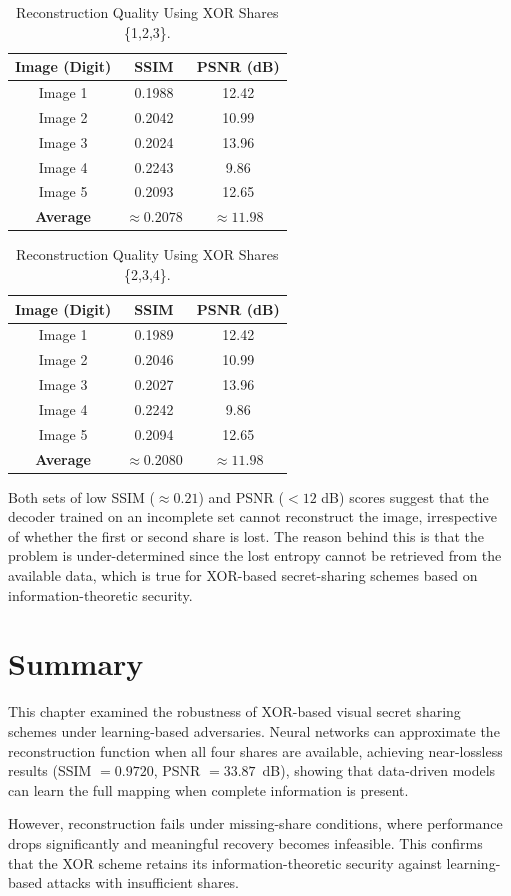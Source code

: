 \begin{table}[htbp]
\centering
\caption{Reconstruction Quality Using XOR Shares \{1,2,3\}.}
\label{tab:xor123}
\begin{tabular}{|c|c|c|}
\hline
\textbf{Image (Digit)} & \textbf{SSIM} & \textbf{PSNR (dB)} \\
\hline
Image 1   & 0.1988 & 12.42 \\
Image 2   & 0.2042 & 10.99 \\
Image 3   & 0.2024 & 13.96 \\
Image 4   & 0.2243 &  9.86 \\
Image 5   & 0.2093 & 12.65 \\
\hline
\textbf{Average} & $\mathbf{\approx 0.2078}$ & $\mathbf{\approx 11.98}$ \\
\hline
\end{tabular}
\end{table}

\begin{table}[htbp]
\centering
\caption{Reconstruction Quality Using XOR Shares \{2,3,4\}.}
\label{tab:xor234}
\begin{tabular}{|c|c|c|}
\hline
\textbf{Image (Digit)} & \textbf{SSIM} & \textbf{PSNR (dB)} \\
\hline
Image 1   & 0.1989 & 12.42 \\
Image 2   & 0.2046 & 10.99 \\
Image 3   & 0.2027 & 13.96 \\
Image 4   & 0.2242 &  9.86 \\
Image 5   & 0.2094 & 12.65 \\
\hline
\textbf{Average} & $\mathbf{\approx 0.2080}$ & $\mathbf{\approx 11.98}$ \\
\hline
\end{tabular}
\end{table}


Both sets of low SSIM ($\approx 0.21$) and PSNR ($< 12$ dB) scores suggest that the decoder trained on an incomplete set cannot reconstruct the image, irrespective of whether the first or second share is lost. The reason behind this is that the problem is under-determined since the lost entropy cannot be retrieved from the available data, which is true for XOR-based secret-sharing schemes based on information-theoretic security.
\section{Summary}

This chapter examined the robustness of XOR-based visual secret sharing schemes under learning-based adversaries. Neural networks can approximate the reconstruction function when all four shares are available, achieving near-lossless results (SSIM $= 0.9720$, PSNR $= 33.87$~dB), showing that data-driven models can learn the full mapping when complete information is present.

However, reconstruction fails under missing-share conditions, where performance drops significantly and meaningful recovery becomes infeasible. This confirms that the XOR scheme retains its information-theoretic security against learning-based attacks with insufficient shares.

